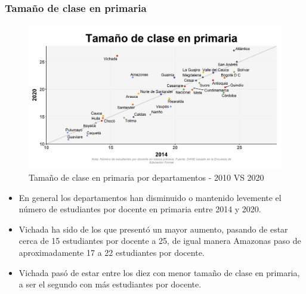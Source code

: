         \subsubsection{Tamaño de clase en primaria}

    \begin{figure}[H]
        \caption{Tamaño de clase en primaria por departamentos - 2010 VS 2020 \label{map_result_2} }
        \begin{center}
        \includegraphics[width=\textwidth,keepaspectratio]{img/var_228_scatter_time.png}
        \end{center}
    \end{figure}
            \begin{itemize}
                \item En general los departamentos han disminuido o mantenido levemente el número de estudiantes por docente en primaria entre 2014 y 2020.
                \item Vichada ha sido de los que presentó un mayor aumento, pasando de estar cerca de 15 estudiantes por docente a 25, de igual manera Amazonas paso de aproximadamente 17 a 22 estudiantes por docente.
                \item Vichada pasó de estar entre los diez con menor tamaño de clase en primaria, a ser el segundo con más estudiantes por docente.
                \end{itemize}

